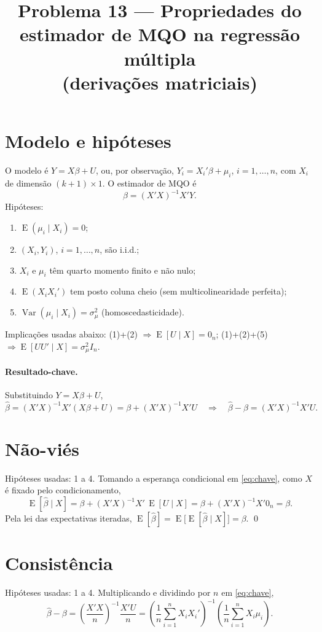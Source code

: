\documentclass[12pt,a4paper]{article}
\title{Problema 13 --- Propriedades do estimador de MQO na regressão múltipla\\(derivações matriciais)}
\date{}
\newcommand{\E}{\operatorname{E}}
\newcommand{\Var}{\operatorname{Var}}
\begin{document}
\maketitle

\section*{Modelo e hipóteses}
O modelo é $Y = X\beta + U$, ou, por observação, $Y_i = X_i'\beta + \mu_i$, $i=1,\dots,n$, com $X_i$ de dimensão $(k+1)\times 1$. O estimador de MQO é
\[
  \hat\beta = (X'X)^{-1}X'Y.
\]
Hipóteses:
\begin{enumerate}
  \item $\E(\mu_i\mid X_i)=0$;
  \item $(X_i,Y_i)$, $i=1,\dots,n$, são i.i.d.;
  \item $X_i$ e $\mu_i$ têm quarto momento finito e não nulo;
  \item $\E(X_iX_i')$ tem posto coluna cheio (sem multicolinearidade perfeita);
  \item $\Var(\mu_i\mid X_i)=\sigma_\mu^2$ (homoscedasticidade).
\end{enumerate}
Implicações usadas abaixo: (1)+(2) $\Rightarrow \E[U\mid X]=0_n$; (1)+(2)+(5) $\Rightarrow \E[UU'\mid X]=\sigma_\mu^2 I_n$.

\paragraph{Resultado-chave.} Substituindo $Y=X\beta+U$,
\begin{equation}\label{eq:chave}
  \hat\beta = (X'X)^{-1}X'(X\beta+U) = \beta + (X'X)^{-1}X'U
  \quad\Longrightarrow\quad
  \hat\beta-\beta = (X'X)^{-1}X'U.
\end{equation}

\section{Não-viés}
Hipóteses usadas: 1 a 4. Tomando a esperança condicional em \eqref{eq:chave}, como $X$ é fixado pelo condicionamento,
\[
  \E[\hat\beta\mid X] = \beta + (X'X)^{-1}X'\,\E[U\mid X] = \beta + (X'X)^{-1}X'0_n = \beta.
\]
Pela lei das expectativas iteradas, $\E[\hat\beta]=\E\big[\E[\hat\beta\mid X]\big]=\beta$. \qed

\section{Consistência}
Hipóteses usadas: 1 a 4. Multiplicando e dividindo por $n$ em \eqref{eq:chave},
\[
  \hat\beta-\beta = \left(\frac{X'X}{n}\right)^{-1}\frac{X'U}{n}
  = \left(\frac1n\sum_{i=1}^n X_iX_i'\right)^{-1}\left(\frac1n\sum_{i=1}^n X_i\mu_i\right).
\]
\end{document}
